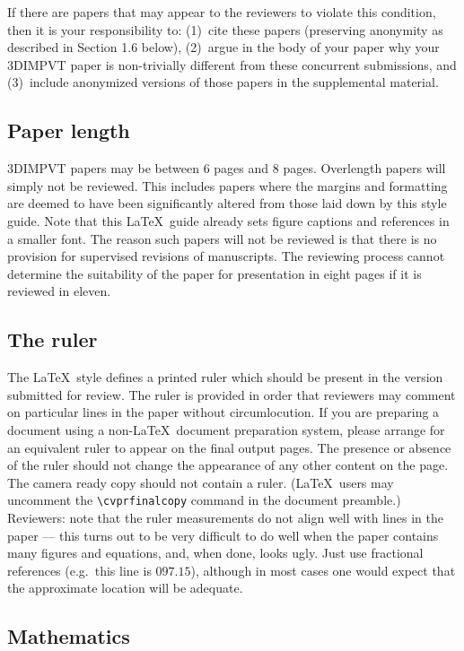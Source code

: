 \documentclass[10pt,twocolumn,letterpaper]{article}
\begin{document}
If there are papers that may appear to the reviewers to violate this
condition, then it is your responsibility to: (1)~cite these papers
(preserving anonymity as described in Section 1.6 below), (2)~argue in
the body of your paper why your 3DIMPVT paper is non-trivially
different from these concurrent submissions, and (3)~include
anonymized versions of those papers in the supplemental material.

\subsection{Paper length}
3DIMPVT papers may be between 6 pages and 8 pages.  Overlength papers
will simply not be reviewed.  This includes papers where the margins
and formatting are deemed to have been significantly altered from
those laid down by this style guide.  Note that this \LaTeX\ guide
already sets figure captions and references in a smaller font.  The
reason such papers will not be reviewed is that there is no provision
for supervised revisions of manuscripts.  The reviewing process cannot
determine the suitability of the paper for presentation in eight pages
if it is reviewed in eleven.

\subsection{The ruler}
The \LaTeX\ style defines a printed ruler which should be present in
the version submitted for review.  The ruler is provided in order that
reviewers may comment on particular lines in the paper without
circumlocution.  If you are preparing a document using a non-\LaTeX\
document preparation system, please arrange for an equivalent ruler to
appear on the final output pages.  The presence or absence of the
ruler should not change the appearance of any other content on the
page.  The camera ready copy should not contain a ruler. (\LaTeX\
users may uncomment the \verb'\cvprfinalcopy' command in the document
preamble.)  Reviewers: note that the ruler measurements do not align
well with lines in the paper --- this turns out to be very difficult
to do well when the paper contains many figures and equations, and,
when done, looks ugly.  Just use fractional references (e.g.\ this
line is $097.15$), although in most cases one would expect that the
approximate location will be adequate.

\subsection{Mathematics}
\end{document}
